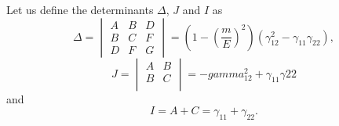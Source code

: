 Let us define the determinants $\Delta$, $J$ and $I$ as
%
\begin{equation}
  \Delta = 
  \begin{vmatrix}
    A & B & D  \\
    B & C & F  \\
    D & F & G
  \end{vmatrix}
  = \left( 1 - \left( \frac{m}{E} \right)^2 \right) \left(\gamma_{12}^2-\gamma_{11} \gamma_{22}\right)
  \label{eq:arbitrary_penrose_quadratic_determinant}
  ,
\end{equation}
%
\begin{equation}
  J = 
  \begin{vmatrix}
    A & B \\
    B & C \\
  \end{vmatrix}
  = -gamma_{12}^2 + \gamma_{11}\gamma{22}
  \label{eq:arbitrary_penrose_quadratic_J}
\end{equation}
%
and
%
\begin{equation}
  I = A + C = \gamma_{11} + \gamma_{22}.
  \label{eq:arbitrary_penrose_quadratic_I}
\end{equation}

